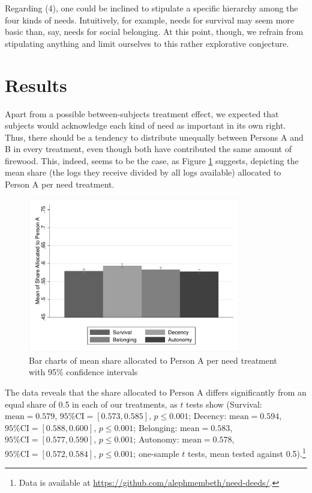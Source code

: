 \documentclass[egregdoesnotlikesansseriftitles]{scrartcl}
\begin{document}
\noindent Regarding (4), one could be inclined to stipulate a specific hierarchy among the four kinds of needs.
Intuitively, for example, needs for survival may seem more basic than, say, needs for social belonging.
At this point, though, we refrain from stipulating anything and limit ourselves to this rather explorative conjecture.


\section{Results}\label{sec:results}
Apart from a possible between-subjects treatment effect, we expected that subjects would acknowledge each kind of need as important in its own right.
Thus, there should be a tendency to distribute unequally between Persons A and B in every treatment, even though both have contributed the same amount of firewood.
This, indeed, seems to be the case, as Figure \ref{fig:figure_1} suggests, depicting the mean share (the logs they receive divided by all logs available) allocated to Person A per need treatment.

\begin{figure}[ht]
   \centering
   \includegraphics[width=25em]{figures/figure_1.pdf}
   \caption{Bar charts of mean share allocated to Person A per need treatment with 95\% confidence intervals}
   \label{fig:figure_1}
\end{figure}

The data reveals that the share allocated to Person A differs significantly from an equal share of 0.5 in each of our treatments, as $t$ tests show (Survival: $\text{mean}=0.579$, $\text{95\% CI}=[0.573,0.585]$, $p\le0.001$; Decency: $\text{mean}=0.594$, $\text{95\% CI}=[0.588,0.600]$, $p\le0.001$; Belonging: $\text{mean}=0.583$, $\text{95\% CI}=[0.577,0.590]$, $p\le0.001$; Autonomy: $\text{mean}=0.578$, $\text{95\% CI}=[0.572,0.584]$, $p\le0.001$; one-sample $t$ tests, mean tested against 0.5).\footnote{Data is available at \url{https://github.com/alephmembeth/need-deeds/}.}
\end{document}
